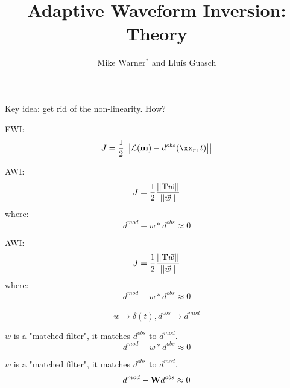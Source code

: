 


\title[]{Adaptive Waveform Inversion: Theory}
\subtitle{}
\author[]{Mike Warner$^*$ and Llu\'{i}s Guasch}
\date{}
\logo{}



\Large

\def\big#1{\begin{center} \LARGE \textbf{#1} \end{center}}
\def\cen#1{\begin{center}        \textbf{#1} \end{center}}

 { \cwpcover }



\begin{frame}
  Key idea: get rid of the non-linearity. How? 
\end{frame}

\begin{frame}
      FWI: \\
      \[J = \frac{1}{2} \left | \left | \mathcal{L}({\bf m}) -d^{obs}(\xx_r,t)\right | \right|\]
\end{frame}

\begin{frame}
      AWI: \\
      \[J = \frac{1}{2} \frac{\left | \left | {\bf T} \vec{w} \right | \right|}{\left |\left| \vec{w} \right | \right|}\]
      where:\\
      \[ d^{mod} - w* d^{obs} \approx 0\]
\end{frame}
\begin{frame}
      AWI: \\
      \[J = \frac{1}{2} \frac{\left | \left | {\bf T} \vec{w} \right | \right|}{\left |\left| \vec{w} \right | \right|}\]
      where:\\
      \[ d^{mod} - w* d^{obs} \approx 0\]\\

      \[w \rightarrow \delta(t), d^{obs}\rightarrow d^{mod} \]
\end{frame}


\begin{frame}
  $w$ is a "matched filter", it matches $d^{obs}$ to $d^{mod}$.
      \[ d^{mod} - w* d^{obs} \approx 0\]
\end{frame}

\begin{frame}
  $w$ is a "matched filter", it matches $d^{obs}$ to $d^{mod}$.
      \[ d^{mod} - {\bf W} d^{obs} \approx 0\]
\end{frame}

